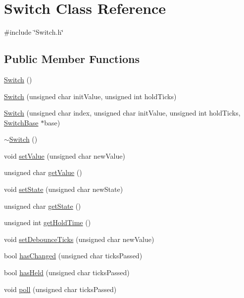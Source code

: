\hypertarget{class_switch}{}\section{Switch Class Reference}
\label{class_switch}


{\ttfamily \#include \char`\"{}Switch.\+h\char`\"{}}

\subsection*{Public Member Functions}
\begin{DoxyCompactItemize}
\item 
\hyperlink{class_switch_a54db96db46113c6a4904553796d183ce}{Switch} ()
\item 
\hyperlink{class_switch_a44465bb81ffe5495c856653dde8fce95}{Switch} (unsigned char init\+Value, unsigned int hold\+Ticks)
\item 
\hyperlink{class_switch_aeccf02d441097b52da2f6b0ee16c7acd}{Switch} (unsigned char index, unsigned char init\+Value, unsigned int hold\+Ticks, \hyperlink{class_switch_base}{Switch\+Base} $\ast$base)
\item 
\hyperlink{class_switch_ac9e0d5810af5ea21572d5dd7248baed8}{$\sim$\+Switch} ()
\item 
void \hyperlink{class_switch_af4d055387cb6f0a2278db5f0b4f01ede}{set\+Value} (unsigned char new\+Value)
\item 
unsigned char \hyperlink{class_switch_a403dba5cc7695d5d19e62b87e87940fe}{get\+Value} ()
\item 
void \hyperlink{class_switch_a29ddb1bfd9284e52b4adb0063d69371c}{set\+State} (unsigned char new\+State)
\item 
unsigned char \hyperlink{class_switch_a1a4f21940769f45910075ae6df70cae9}{get\+State} ()
\item 
unsigned int \hyperlink{class_switch_ac8a0a047de62c7769c32244f68328edd}{get\+Hold\+Time} ()
\item 
void \hyperlink{class_switch_ad1991a92a3b5c470d667a5e26c59ef59}{set\+Debounce\+Ticks} (unsigned char new\+Value)
\item 
bool \hyperlink{class_switch_a723c543e4e77a985ce0cdf195f6882ab}{has\+Changed} (unsigned char ticks\+Passed)
\item 
bool \hyperlink{class_switch_a6cb0b78f23c412042b31ce8af317c718}{has\+Held} (unsigned char ticks\+Passed)
\item 
void \hyperlink{class_switch_a5401c79fd9fda679eae5e4bba5578a35}{poll} (unsigned char ticks\+Passed)
\end{DoxyCompactItemize}


